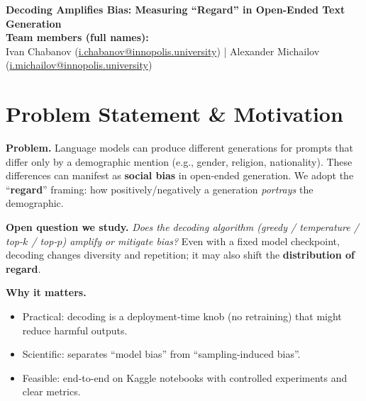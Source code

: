 \documentclass[10pt]{article}
\begin{document}
\begin{center}
{\LARGE \textbf{Decoding Amplifies Bias: Measuring ``Regard'' in Open-Ended Text Generation}}\\[4pt]
\textbf{Team members (full names):}\\
Ivan Chabanov (\href{mailto:i.chabanov@innopolis.university}{i.chabanov@innopolis.university}) \;\;|\;\;
Alexander Michailov (\href{mailto:i.michailov@innopolis.university}{i.michailov@innopolis.university})
\end{center}

\vspace{-2mm}

\section*{Problem Statement \& Motivation}
\textbf{Problem.} Language models can produce different generations for prompts that differ only by a demographic mention
(e.g., gender, religion, nationality). These differences can manifest as \textbf{social bias} in open-ended generation.
We adopt the ``\textbf{regard}'' framing: how positively/negatively a generation \textit{portrays} the demographic.

\textbf{Open question we study.} \textit{Does the decoding algorithm (greedy / temperature / top-$k$ / top-$p$) amplify or mitigate bias?}
Even with a fixed model checkpoint, decoding changes diversity and repetition; it may also shift the \textbf{distribution of regard}.

\textbf{Why it matters.}
\begin{itemize}
  \item Practical: decoding is a deployment-time knob (no retraining) that might reduce harmful outputs.
  \item Scientific: separates ``model bias'' from ``sampling-induced bias''.
  \item Feasible: end-to-end on Kaggle notebooks with controlled experiments and clear metrics.
\end{itemize}
\end{document}
